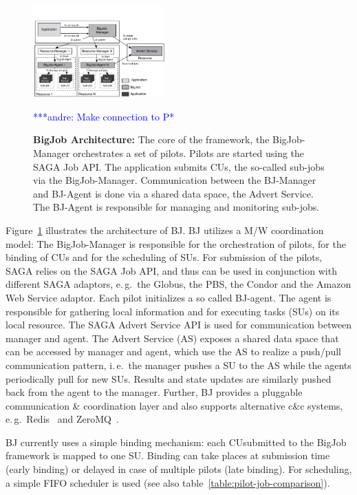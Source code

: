 \documentclass[conference,final]{IEEEtran}
\newcommand{\alnote}[1]{ {\textcolor{blue} { ***andre: #1 }}}
\newcommand{\alnote}[1]{}
\newcommand{\cu}{CU}
\newcommand{\upp}{\vspace*{-0.5em}}
\begin{document}
\begin{figure}[t]
	\upp\upp\upp\upp
	\centering
	\includegraphics[width=0.45\textwidth]{figures/re_bigjob_interactions.pdf}
	\caption{\textbf{BigJob Architecture:} The core of the
          framework, the BigJob-Manager orchestrates a set of
          pilots. Pilots are started using the SAGA Job API. The
          application submits CUs, the so-called sub-jobs via the
          BigJob-Manager. Communication between the BJ-Manager and
          BJ-Agent is done via a shared data space, the Advert
          Service. The BJ-Agent is responsible for managing and
          monitoring sub-jobs.}
		\alnote{Make connection to P*}
	\label{fig:figures_re_bigjob_interactions}
	\upp\upp \upp
\end{figure}


Figure~\ref{fig:figures_re_bigjob_interactions} illustrates the architecture of
BJ. BJ utilizes a M/W coordination model: The BigJob-Manager is responsible for
the orchestration of pilots, for the binding of \cu s and for the scheduling of
SUs. For submission of the pilots, SAGA relies on the SAGA Job API, and thus can
be used in conjunction with different SAGA adaptors, e.\,g.\ the Globus, the
PBS, the Condor and the Amazon Web Service adaptor. Each pilot initializes a so
called BJ-agent. The agent is responsible for gathering local information
and for executing tasks (SUs) on its local resource. The SAGA Advert Service API
is used for communication between manager and agent. The Advert Service (AS)
exposes a shared data space that can be accessed by manager and agent, which use
the AS to realize a push/pull communication pattern, i.\,e.\ the manager pushes
a SU to the AS while the agents periodically pull for new SUs. Results and state
updates are similarly pushed back from the agent to the manager. Further, BJ
provides a pluggable communication \& coordination layer and also supports
alternative c\&c systems, e.\,g.\ Redis~\cite{redis} and ZeroMQ~\cite{zmq}.

BJ currently uses a simple binding mechanism: each \cu  submitted to the BigJob
framework is mapped to one SU. Binding can take places at submission
time (early binding) or delayed in case of multiple pilots (late binding). 
For scheduling, a simple FIFO scheduler is used (see also
table~\ref{table:pilot-job-comparison}).
\end{document}
